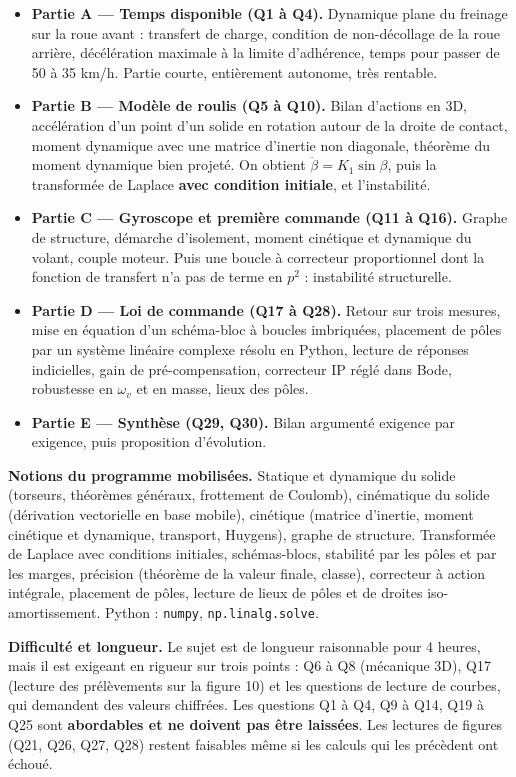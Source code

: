 \documentclass[11pt,a4paper]{article}
\providecommand{\tightlist}{\setlength{\itemsep}{0pt}\setlength{\parskip}{0pt}}
\begin{document}
\begin{itemize}
\tightlist
\item
  \textbf{Partie A --- Temps disponible (Q1 à Q4).} Dynamique plane du freinage sur la roue avant : transfert de charge, condition de non-décollage de la roue arrière, décélération maximale à la limite d'adhérence, temps pour passer de 50 à 35 km/h. Partie courte, entièrement autonome, très rentable.
\item
  \textbf{Partie B --- Modèle de roulis (Q5 à Q10).} Bilan d'actions en 3D, accélération d'un point d'un solide en rotation autour de la droite de contact, moment dynamique avec une matrice d'inertie non diagonale, théorème du moment dynamique bien projeté. On obtient \(\ddot\beta=K_1\sin\beta\), puis la transformée de Laplace \textbf{avec condition initiale}, et l'instabilité.
\item
  \textbf{Partie C --- Gyroscope et première commande (Q11 à Q16).} Graphe de structure, démarche d'isolement, moment cinétique et dynamique du volant, couple moteur. Puis une boucle à correcteur proportionnel dont la fonction de transfert n'a pas de terme en \(p^2\) : instabilité structurelle.
\item
  \textbf{Partie D --- Loi de commande (Q17 à Q28).} Retour sur trois mesures, mise en équation d'un schéma-bloc à boucles imbriquées, placement de pôles par un système linéaire complexe résolu en Python, lecture de réponses indicielles, gain de pré-compensation, correcteur IP réglé dans Bode, robustesse en \(\omega_v\) et en masse, lieux des pôles.
\item
  \textbf{Partie E --- Synthèse (Q29, Q30).} Bilan argumenté exigence par exigence, puis proposition d'évolution.
\end{itemize}

\textbf{Notions du programme mobilisées.} Statique et dynamique du solide (torseurs, théorèmes généraux, frottement de Coulomb), cinématique du solide (dérivation vectorielle en base mobile), cinétique (matrice d'inertie, moment cinétique et dynamique, transport, Huygens), graphe de structure. Transformée de Laplace avec conditions initiales, schémas-blocs, stabilité par les pôles et par les marges, précision (théorème de la valeur finale, classe), correcteur à action intégrale, placement de pôles, lecture de lieux de pôles et de droites iso-amortissement. Python : \texttt{numpy}, \texttt{np.linalg.solve}.

\textbf{Difficulté et longueur.} Le sujet est de longueur raisonnable pour 4 heures, mais il est exigeant en rigueur sur trois points : Q6 à Q8 (mécanique 3D), Q17 (lecture des prélèvements sur la figure 10) et les questions de lecture de courbes, qui demandent des valeurs chiffrées. Les questions Q1 à Q4, Q9 à Q14, Q19 à Q25 sont \textbf{abordables et ne doivent pas être laissées}. Les lectures de figures (Q21, Q26, Q27, Q28) restent faisables même si les calculs qui les précèdent ont échoué.
\end{document}
